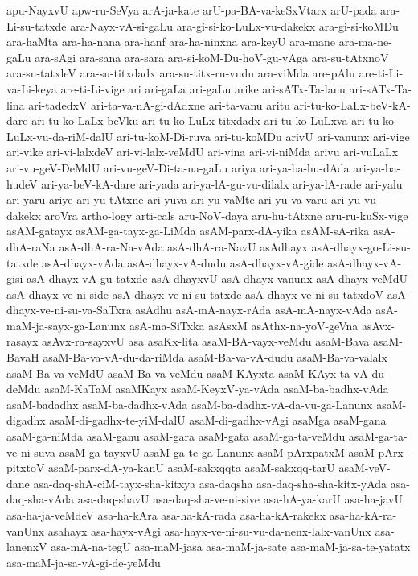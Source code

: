 {apu-NayxvU
apw-ru-SeVya
arA-ja-kate
arU-pa-BA-va-keSxVtarx
arU-pada
ara-Li-su-tatxde
ara-Nayx-vA-si-gaLu
ara-gi-si-ko-LuLx-vu-dakekx
ara-gi-si-koMDu
ara-haMta
ara-ha-nana
ara-hanf
ara-ha-ninxna
ara-keyU
ara-mane
ara-ma-ne-gaLu
ara-sAgi
ara-sana
ara-sara
ara-si-koM-Du-hoV-gu-vAga
ara-su-tAtxnoV
ara-su-tatxleV
ara-su-titxdadx
ara-su-titx-ru-vudu
ara-viMda
are-pAlu
are-ti-Li-va-Li-keya
are-ti-Li-vige
ari
ari-gaLa
ari-gaLu
arike
ari-sATx-Ta-lanu
ari-sATx-Ta-lina
ari-tadedxV
ari-ta-va-nA-gi-dAdxne
ari-ta-vanu
aritu
ari-tu-ko-LaLx-beV-kA-dare
ari-tu-ko-LaLx-beVku
ari-tu-ko-LuLx-titxdadx
ari-tu-ko-LuLxva
ari-tu-ko-LuLx-vu-da-riM-dalU
ari-tu-koM-Di-ruva
ari-tu-koMDu
arivU
ari-vanunx
ari-vige
ari-vike
ari-vi-lalxdeV
ari-vi-lalx-veMdU
ari-vina
ari-vi-niMda
arivu
ari-vuLaLx
ari-vu-geV-DeMdU
ari-vu-geV-Di-ta-na-gaLu
ariya
ari-ya-ba-hu-dAda
ari-ya-ba-hudeV
ari-ya-beV-kA-dare
ari-yada
ari-ya-lA-gu-vu-dilalx
ari-ya-lA-rade
ari-yalu
ari-yaru
ariye
ari-yu-tAtxne
ari-yuva
ari-yu-vaMte
ari-yu-va-varu
ari-yu-vu-dakekx
aroVra
artho-logy
arti-cals
aru-NoV-daya
aru-hu-tAtxne
aru-ru-kuSx-vige
asAM-gatayx
asAM-ga-tayx-ga-LiMda
asAM-parx-dA-yika
asAM-sA-rika
asA-dhA-raNa
asA-dhA-ra-Na-vAda
asA-dhA-ra-NavU
asAdhayx
asA-dhayx-go-Li-su-tatxde
asA-dhayx-vAda
asA-dhayx-vA-dudu
asA-dhayx-vA-gide
asA-dhayx-vA-gisi
asA-dhayx-vA-gu-tatxde
asA-dhayxvU
asA-dhayx-vanunx
asA-dhayx-veMdU
asA-dhayx-ve-ni-side
asA-dhayx-ve-ni-su-tatxde
asA-dhayx-ve-ni-su-tatxdoV
asA-dhayx-ve-ni-su-va-SaTxra
asAdhu
asA-mA-nayx-rAda
asA-mA-nayx-vAda
asA-maM-ja-sayx-ga-Lanunx
asA-ma-SiTxka
asAsxM
asAthx-na-yoV-geVna
asAvx-rasayx
asAvx-ra-sayxvU
asa
asaKx-lita
asaM-BA-vayx-veMdu
asaM-Bava
asaM-BavaH
asaM-Ba-va-vA-du-da-riMda
asaM-Ba-va-vA-dudu
asaM-Ba-va-valalx
asaM-Ba-va-veMdU
asaM-Ba-va-veMdu
asaM-KAyxta
asaM-KAyx-ta-vA-du-deMdu
asaM-KaTaM
asaMKayx
asaM-KeyxV-ya-vAda
asaM-ba-badhx-vAda
asaM-badadhx
asaM-ba-dadhx-vAda
asaM-ba-dadhx-vA-da-vu-ga-Lanunx
asaM-digadhx
asaM-di-gadhx-te-yiM-dalU
asaM-di-gadhx-vAgi
asaMga
asaM-gana
asaM-ga-niMda
asaM-ganu
asaM-gara
asaM-gata
asaM-ga-ta-veMdu
asaM-ga-ta-ve-ni-suva
asaM-ga-tayxvU
asaM-ga-te-ga-Lanunx
asaM-pArxpatxM
asaM-pArx-pitxtoV
asaM-parx-dA-ya-kanU
asaM-sakxqqta
asaM-sakxqq-tarU
asaM-veV-dane
asa-daq-shA-ciM-tayx-sha-kitxya
asa-daqsha
asa-daq-sha-sha-kitx-yAda
asa-daq-sha-vAda
asa-daq-shavU
asa-daq-sha-ve-ni-sive
asa-hA-ya-karU
asa-ha-javU
asa-ha-ja-veMdeV
asa-ha-kAra
asa-ha-kA-rada
asa-ha-kA-rakekx
asa-ha-kA-ra-vanUnx
asahayx
asa-hayx-vAgi
asa-hayx-ve-ni-su-vu-da-nenx-lalx-vanUnx
asa-lanenxV
asa-mA-na-tegU
asa-maM-jasa
asa-maM-ja-sate
asa-maM-ja-sa-te-yatatx
asa-maM-ja-sa-vA-gi-de-yeMdu
}
